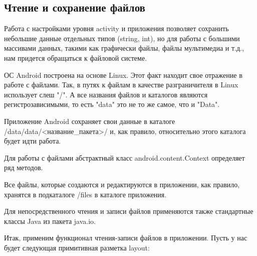\subsection{Чтение и сохранение файлов}
Работа с настройками уровня activity и приложения позволяет сохранить
небольшие данные отдельных типов (string, int), но для работы с большими
массивами данных, такими как графически файлы, файлы мультимедиа и
т.д., нам придется обращаться к файловой системе.\par
ОС Android построена на основе Linux. Этот факт находит свое отражение в
работе с файлами. Так, в путях к файлам в качестве разграничителя в Linux
использует слеш "/". А все названия файлов и каталогов являются
регистрозависимыми, то есть "data" это не то же самое, что и "Data".\par
Приложение Android сохраняет свои данные в каталоге
/data/data/<название\_пакета>/ и, как правило, относительно этого каталога
будет идти работа.\par
Для работы с файлами абстрактный класс android.content.Context определяет
ряд методов.\par
Все файлы, которые создаются и редактируются в приложении, как правило,
хранятся в подкаталоге /files в каталоге приложения.\par
Для непосредственного чтения и записи файлов применяются также
стандартные классы Java из пакета java.io.\par
Итак, применим функционал чтения-записи файлов в приложении. Пусть у
нас будет следующая примитивная разметка layout:

